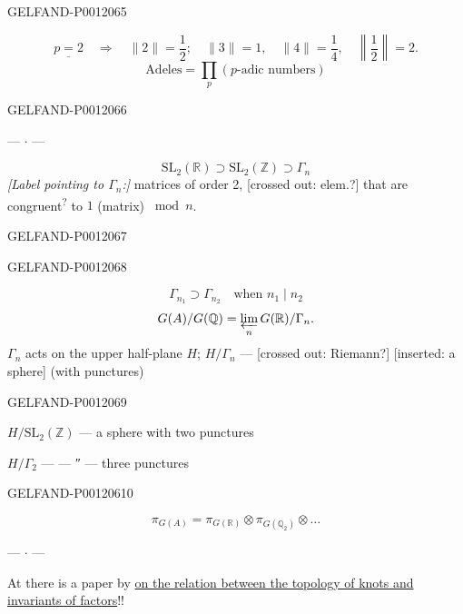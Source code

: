 \begin{GelfandAdjacentEvidence}{GELFAND-P001206}{5}

\[
\underline{p=2}\quad\Rightarrow\quad
\|2\|=\frac12;\quad\|3\|=1,\quad\|4\|=\frac14,\quad
\left\|\frac12\right\|=2.
\]
\[
\text{Adeles}=\prod_p(\text{\(p\)-adic numbers})
\]
\end{GelfandAdjacentEvidence}
\begin{GelfandAdjacentEvidence}{GELFAND-P001206}{6}

\begin{center}--- \(\cdot\) ---\end{center}
\[
\mathrm{SL}_2(\mathbb R)\supset\mathrm{SL}_2(\mathbb Z)\supset\Gamma_n
\]
\textit{[Label pointing to \(\Gamma_n\):]} matrices of order 2,
[crossed out: elem.?] that are congruent\textsuperscript{?} to \(1\) (matrix) \(\bmod n\).
\end{GelfandAdjacentEvidence}
\begin{GelfandAdjacentEvidence}{GELFAND-P001206}{7}

\end{GelfandAdjacentEvidence}
\begin{GelfandAdjacentEvidence}{GELFAND-P001206}{8}

\[
\Gamma_{n_1}\supset\Gamma_{n_2}\quad\text{when }n_1\mid n_2
\]
\[
G(A)/G(\mathbb Q)=\varprojlim_n G(\mathbb R)/\Gamma_n.
\]
\(\Gamma_n\) acts on the upper half-plane \(H\); \(H/\Gamma_n\) ---
[crossed out: Riemann?] [inserted: a sphere] (with punctures)
\end{GelfandAdjacentEvidence}
\begin{GelfandAdjacentEvidence}{GELFAND-P001206}{9}


\(H/\mathrm{SL}_2(\mathbb Z)\) --- a sphere with two punctures

\(H/\Gamma_2\) --- --- ″ --- three punctures
\end{GelfandAdjacentEvidence}
\begin{GelfandAdjacentEvidence}{GELFAND-P001206}{10}

\[
\pi_{G(A)}=\pi_{G(\mathbb R)}\otimes\pi_{G(\mathbb Q_2)}\otimes\ldots
\]
\begin{center}--- \(\cdot\) ---\end{center}
 At  there is a paper by 
\underline{on the relation between the topology of knots and invariants of factors}!!
\end{GelfandAdjacentEvidence}

